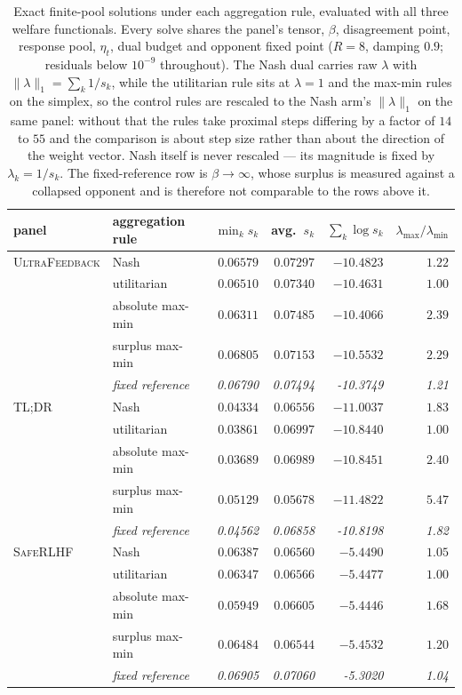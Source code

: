 \documentclass{article}
\theoremstyle{remark}
\theoremstyle{plain}
\begin{document}
\begin{table}[t]
\centering\scriptsize
\setlength{\tabcolsep}{3.0pt}
\caption{Exact finite-pool solutions under each aggregation rule, evaluated with all three welfare functionals. Every solve shares the panel's tensor, $\beta$, disagreement point, response pool, $\eta_t$, dual budget and opponent fixed point ($R=8$, damping $0.9$; residuals below $10^{-9}$ throughout). The Nash dual carries raw $\lambda$ with $\|\lambda\|_1=\sum_k 1/s_k$, while the utilitarian rule sits at $\lambda=1$ and the max-min rules on the simplex, so the control rules are rescaled to the Nash arm's $\|\lambda\|_1$ on the same panel: without that the rules take proximal steps differing by a factor of $14$ to $55$ and the comparison is about step size rather than about the direction of the weight vector. Nash itself is never rescaled --- its magnitude is fixed by $\lambda_k=1/s_k$. The fixed-reference row is $\beta\to\infty$, whose surplus is measured against a collapsed opponent and is therefore not comparable to the rows above it.}
\label{tab:matched-welfare}
\begin{tabular}{llrrrr}
\toprule
panel & aggregation rule & $\min_k s_k$ & avg.\ $s_k$ & $\sum_k\log s_k$ & $\lambda_{\max}/\lambda_{\min}$\\
\midrule
\textsc{UltraFeedback} & Nash & $0.06579$ & $0.07297$ & $-10.4823$ & $1.22$\\
 & utilitarian & $0.06510$ & $0.07340$ & $-10.4631$ & $1.00$\\
 & absolute max-min & $0.06311$ & $0.07485$ & $\mathbf{-10.4066}$ & $2.39$\\
 & surplus max-min & $\mathbf{0.06805}$ & $0.07153$ & $-10.5532$ & $2.29$\\
 & \emph{fixed reference} & \emph{0.06790} & \emph{0.07494} & \emph{-10.3749} & \emph{1.21}\\
\midrule
\textsc{TL;DR} & Nash & $0.04334$ & $0.06556$ & $-11.0037$ & $1.83$\\
 & utilitarian & $0.03861$ & $0.06997$ & $\mathbf{-10.8440}$ & $1.00$\\
 & absolute max-min & $0.03689$ & $0.06989$ & $-10.8451$ & $2.40$\\
 & surplus max-min & $\mathbf{0.05129}$ & $0.05678$ & $-11.4822$ & $5.47$\\
 & \emph{fixed reference} & \emph{0.04562} & \emph{0.06858} & \emph{-10.8198} & \emph{1.82}\\
\midrule
\textsc{SafeRLHF} & Nash & $0.06387$ & $0.06560$ & $-5.4490$ & $1.05$\\
 & utilitarian & $0.06347$ & $0.06566$ & $-5.4477$ & $1.00$\\
 & absolute max-min & $0.05949$ & $0.06605$ & $\mathbf{-5.4446}$ & $1.68$\\
 & surplus max-min & $\mathbf{0.06484}$ & $0.06544$ & $-5.4532$ & $1.20$\\
 & \emph{fixed reference} & \emph{0.06905} & \emph{0.07060} & \emph{-5.3020} & \emph{1.04}\\
\bottomrule
\end{tabular}
\end{table}
\end{document}
